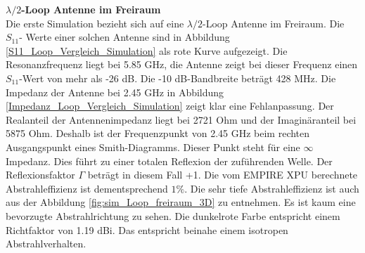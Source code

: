 \textbf{$\lambda/2$-Loop Antenne im Freiraum}\\
Die erste Simulation bezieht sich auf eine $\lambda/2$-Loop Antenne im Freiraum. Die $S_{11}$- Werte einer solchen Antenne sind in Abbildung \ref{S11_Loop_Vergleich_Simulation} als rote Kurve aufgezeigt. Die Resonanzfrequenz liegt bei 5.85 GHz, die Antenne zeigt bei dieser Frequenz einen $S_{11}$-Wert von mehr als -26 dB. Die -10 dB-Bandbreite beträgt 428 MHz. Die Impedanz der Antenne bei 2.45 GHz in Abbildung \ref{Impedanz_Loop_Vergleich_Simulation} zeigt klar eine Fehlanpassung. Der Realanteil der Antennenimpedanz liegt bei 2721 Ohm und der Imaginäranteil bei 5875 Ohm. Deshalb ist der Frequenzpunkt von 2.45 GHz beim rechten Ausgangspunkt eines Smith-Diagramms. Dieser Punkt steht für eine $\infty$ Impedanz. Dies führt zu einer totalen Reflexion der zuführenden Welle. Der Reflexionsfaktor $\Gamma$ beträgt in diesem Fall +1. Die vom EMPIRE XPU berechnete Abstrahleffizienz ist dementsprechend $1\%$. Die sehr tiefe Abstrahleffizienz ist auch aus der Abbildung \ref{fig:sim_Loop_freiraum_3D} zu entnehmen. Es ist kaum eine bevorzugte Abstrahlrichtung zu sehen. Die dunkelrote Farbe entspricht einem Richtfaktor von 1.19 dBi. Das entspricht beinahe einem isotropen Abstrahlverhalten.\\


